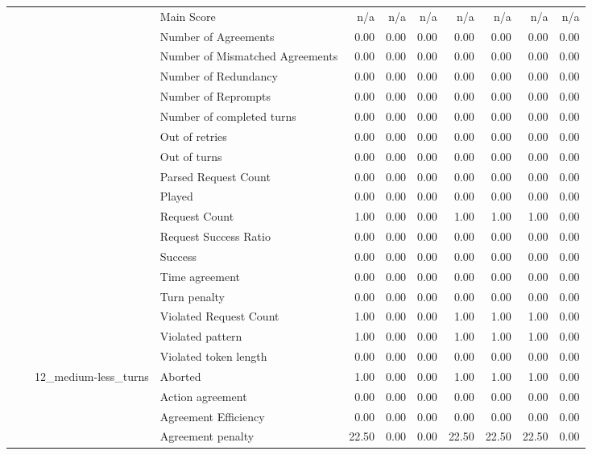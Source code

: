 \begin{tabular}{llllrrrrrrr}
 &  &  & Main Score & n/a & n/a & n/a & n/a & n/a & n/a & n/a \\
 &  &  & Number of Agreements & 0.00 & 0.00 & 0.00 & 0.00 & 0.00 & 0.00 & 0.00 \\
 &  &  & Number of Mismatched Agreements & 0.00 & 0.00 & 0.00 & 0.00 & 0.00 & 0.00 & 0.00 \\
 &  &  & Number of Redundancy & 0.00 & 0.00 & 0.00 & 0.00 & 0.00 & 0.00 & 0.00 \\
 &  &  & Number of Reprompts & 0.00 & 0.00 & 0.00 & 0.00 & 0.00 & 0.00 & 0.00 \\
 &  &  & Number of completed turns & 0.00 & 0.00 & 0.00 & 0.00 & 0.00 & 0.00 & 0.00 \\
 &  &  & Out of retries & 0.00 & 0.00 & 0.00 & 0.00 & 0.00 & 0.00 & 0.00 \\
 &  &  & Out of turns & 0.00 & 0.00 & 0.00 & 0.00 & 0.00 & 0.00 & 0.00 \\
 &  &  & Parsed Request Count & 0.00 & 0.00 & 0.00 & 0.00 & 0.00 & 0.00 & 0.00 \\
 &  &  & Played & 0.00 & 0.00 & 0.00 & 0.00 & 0.00 & 0.00 & 0.00 \\
 &  &  & Request Count & 1.00 & 0.00 & 0.00 & 1.00 & 1.00 & 1.00 & 0.00 \\
 &  &  & Request Success Ratio & 0.00 & 0.00 & 0.00 & 0.00 & 0.00 & 0.00 & 0.00 \\
 &  &  & Success & 0.00 & 0.00 & 0.00 & 0.00 & 0.00 & 0.00 & 0.00 \\
 &  &  & Time agreement & 0.00 & 0.00 & 0.00 & 0.00 & 0.00 & 0.00 & 0.00 \\
 &  &  & Turn penalty & 0.00 & 0.00 & 0.00 & 0.00 & 0.00 & 0.00 & 0.00 \\
 &  &  & Violated Request Count & 1.00 & 0.00 & 0.00 & 1.00 & 1.00 & 1.00 & 0.00 \\
 &  &  & Violated pattern & 1.00 & 0.00 & 0.00 & 1.00 & 1.00 & 1.00 & 0.00 \\
 &  &  & Violated token length & 0.00 & 0.00 & 0.00 & 0.00 & 0.00 & 0.00 & 0.00 \\
\cline{3-11}
 &  & \multirow[t]{27}{*}{12_medium-less_turns} & Aborted & 1.00 & 0.00 & 0.00 & 1.00 & 1.00 & 1.00 & 0.00 \\
 &  &  & Action agreement & 0.00 & 0.00 & 0.00 & 0.00 & 0.00 & 0.00 & 0.00 \\
 &  &  & Agreement Efficiency & 0.00 & 0.00 & 0.00 & 0.00 & 0.00 & 0.00 & 0.00 \\
 &  &  & Agreement penalty & 22.50 & 0.00 & 0.00 & 22.50 & 22.50 & 22.50 & 0.00 \\

\end{tabular}
